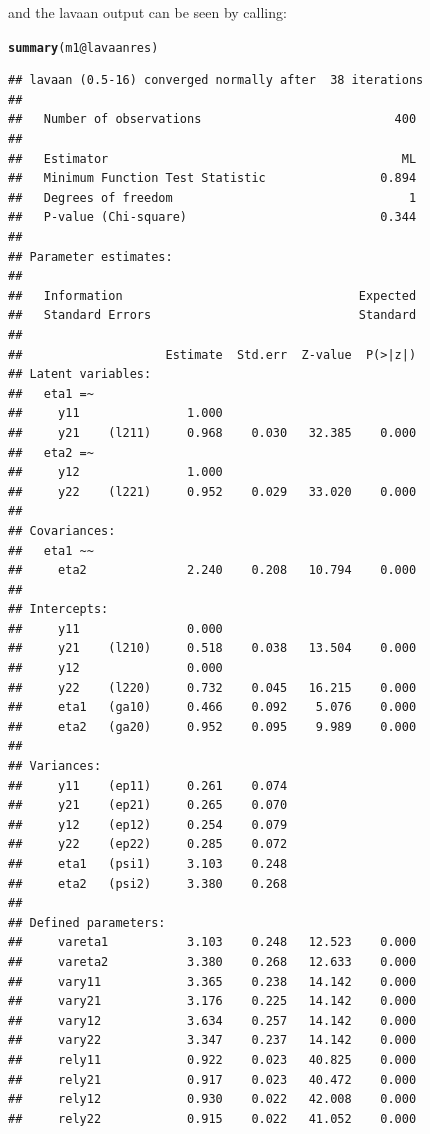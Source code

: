 \documentclass[10pt]{article}\usepackage{graphicx, color}
\makeatletter
\newcommand{\hlfunctioncall}[1]{\textcolor[rgb]{0.501960784313725,0,0.329411764705882}{\textbf{#1}}}%
\newenvironment{kframe}{%
 \def\at@end@of@kframe{}%
 \ifinner\ifhmode%
  \def\at@end@of@kframe{\end{minipage}}%
  \begin{minipage}{\columnwidth}%
 \fi\fi%
 \def\FrameCommand##1{\hskip\@totalleftmargin \hskip-\fboxsep
 \colorbox{shadecolor}{##1}\hskip-\fboxsep
     \hskip-\linewidth \hskip-\@totalleftmargin \hskip\columnwidth}%
 \MakeFramed {\advance\hsize-\width
   \@totalleftmargin\z@ \linewidth\hsize
   \@setminipage}}%
 {\par\unskip\endMakeFramed%
 \at@end@of@kframe}
\newenvironment{knitrout}{}{} %
\makeatother
\begin{document}
%
and the lavaan output can be seen by calling:
%
\begin{knitrout}
\color{fgcolor}\begin{kframe}
\begin{alltt}
\hlfunctioncall{summary}(m1@lavaanres)
\end{alltt}
\begin{verbatim}
## lavaan (0.5-16) converged normally after  38 iterations
## 
##   Number of observations                           400
## 
##   Estimator                                         ML
##   Minimum Function Test Statistic                0.894
##   Degrees of freedom                                 1
##   P-value (Chi-square)                           0.344
## 
## Parameter estimates:
## 
##   Information                                 Expected
##   Standard Errors                             Standard
## 
##                    Estimate  Std.err  Z-value  P(>|z|)
## Latent variables:
##   eta1 =~
##     y11               1.000
##     y21    (l211)     0.968    0.030   32.385    0.000
##   eta2 =~
##     y12               1.000
##     y22    (l221)     0.952    0.029   33.020    0.000
## 
## Covariances:
##   eta1 ~~
##     eta2              2.240    0.208   10.794    0.000
## 
## Intercepts:
##     y11               0.000
##     y21    (l210)     0.518    0.038   13.504    0.000
##     y12               0.000
##     y22    (l220)     0.732    0.045   16.215    0.000
##     eta1   (ga10)     0.466    0.092    5.076    0.000
##     eta2   (ga20)     0.952    0.095    9.989    0.000
## 
## Variances:
##     y11    (ep11)     0.261    0.074
##     y21    (ep21)     0.265    0.070
##     y12    (ep12)     0.254    0.079
##     y22    (ep22)     0.285    0.072
##     eta1   (psi1)     3.103    0.248
##     eta2   (psi2)     3.380    0.268
## 
## Defined parameters:
##     vareta1           3.103    0.248   12.523    0.000
##     vareta2           3.380    0.268   12.633    0.000
##     vary11            3.365    0.238   14.142    0.000
##     vary21            3.176    0.225   14.142    0.000
##     vary12            3.634    0.257   14.142    0.000
##     vary22            3.347    0.237   14.142    0.000
##     rely11            0.922    0.023   40.825    0.000
##     rely21            0.917    0.023   40.472    0.000
##     rely12            0.930    0.022   42.008    0.000
##     rely22            0.915    0.022   41.052    0.000
\end{verbatim}
\end{kframe}
\end{knitrout}
\end{document}
